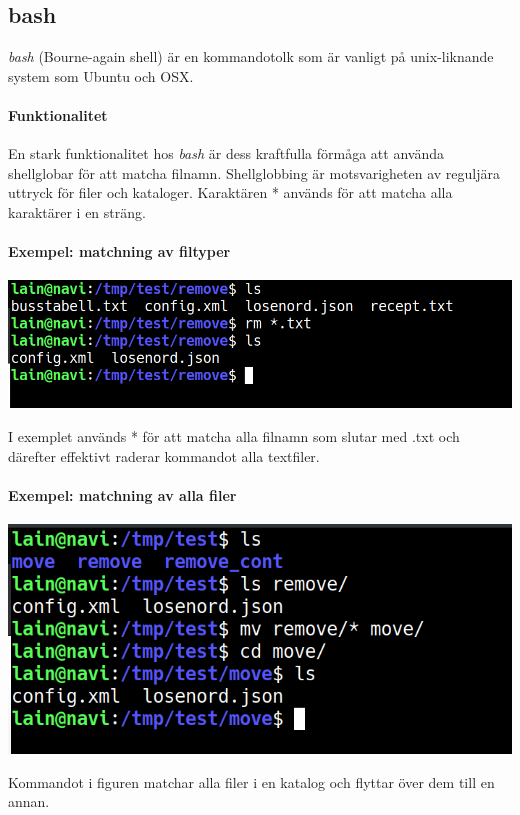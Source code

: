 \subsection{bash}
\emph{bash} (Bourne-again shell) är en kommandotolk som är vanligt på unix-liknande system som Ubuntu och OSX. 
\paragraph{Funktionalitet}
En stark funktionalitet hos \emph{bash} är dess kraftfulla förmåga att använda shellglobar för att matcha filnamn.
Shellglobbing är motsvarigheten av reguljära uttryck för filer och kataloger. Karaktären * används för att matcha alla karaktärer i en sträng.
\paragraph{Exempel: matchning av filtyper}
\begin{center}
        \includegraphics[width=\linewidth]{bilder/bash_remove_filetype.png}
\end{center}
I exemplet används * för att matcha alla filnamn som slutar med .txt och därefter effektivt raderar kommandot alla textfiler.
\paragraph{Exempel: matchning av alla filer}
\begin{center}
        \includegraphics[width=\linewidth]{bilder/bash_move_files.png}
\end{center}
Kommandot i figuren matchar alla filer i en katalog och flyttar över dem till en annan.
